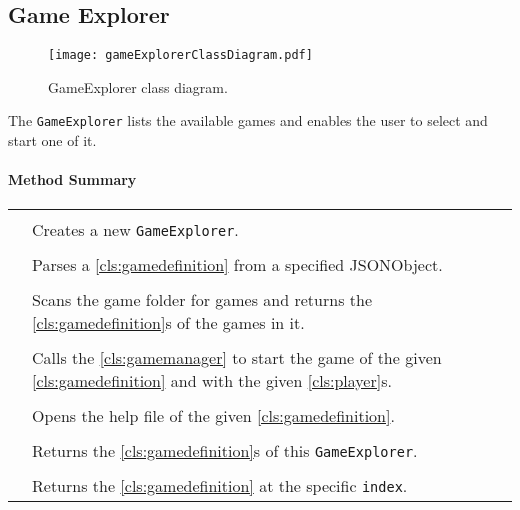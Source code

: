 \subsection{Game Explorer}

\begin{figure}[h]
	\centering
	\texttt{[image: gameExplorerClassDiagram.pdf]}
	\caption{GameExplorer class diagram.}
	\label{img:gameExplorerClassDiagram}
\end{figure}
\pagebreak

The \texttt{GameExplorer} lists the available games and enables the user to select and start one of it.

\centerdash

\paragraph*{Method Summary}
\paragraph*{}
\begin{longtable}{Lp{10cm}}
	\startmethodtable
	 \\
	& Creates a new \texttt{GameExplorer}. \\
	 \\
	& Parses a \ref{cls:gamedefinition} from a specified JSONObject. \\
	 \\
	& Scans the game folder for games and returns the \ref{cls:gamedefinition}s of the games in it. \\
	 \\
	& Calls the \ref{cls:gamemanager} to start the game of the given \ref{cls:gamedefinition} and with the given \ref{cls:player}s. \\
	 \\
	& Opens the help file of the given \ref{cls:gamedefinition}. \\
	 \\
	& Returns the \ref{cls:gamedefinition}s of this \texttt{GameExplorer}. \\
	 \\
	& Returns the \ref{cls:gamedefinition} at the specific \texttt{index}. \\
	\hline
\end{longtable}

